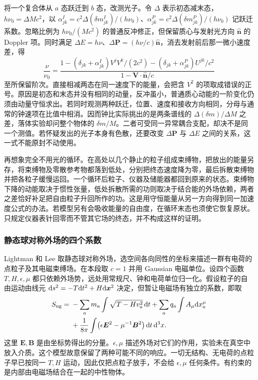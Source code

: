 将一个复合体从 $a$ 态跃迁到 $b$ 态，改测光子。令 $\Delta$ 表示初态减末态，$h\nu_0=\Delta Mc^2$，以 $\alpha^I_{jk}=c^2\Delta(\delta m^I_{jk})/(h\nu_0)$、$\alpha^P_{jk}=c^2\Delta(\delta m^P_{jk})/(h\nu_0)$ 记跃迁系数。忽略比例为 $h\nu_0/(Mc^2)$ 的普通反冲修正，但保留质心与发射光方向 $\hat{\bm n}$ 的 Doppler 项。同时满足 $\Delta E=h\nu$、$\Delta\bm P=(h\nu/c)\hat{\bm n}$，消去发射前后那一微小速度差，得
\[
 \frac{\nu}{\nu_0}=
 \frac{1-(\delta_{jk}+\alpha^I_{jk})V^jV^k/(2c^2)
         -(\delta_{jk}+\alpha^P_{jk})U^{jk}/c^2}
      {1-\bm V\cdot\hat{\bm n}/c}
\]
至所保留阶次。直接相减两态在同一速度下的能量，会把含 $V^2$ 的项取成错误的正号。原因是初态和末态并没有相同的动量，反冲虽小，普通质心动能的一阶变化仍须由动量守恒求出。若同时观测两种跃迁，位置、速度和接收方向相同，分母与通常的钟速项在比值中相消。因而钟比实际挑出的是两条谱线的 $\Delta(\delta m)/\Delta M$ 之差，落体实验却问整个物体的 $\delta m/M$。二者可受同一异常耦合支配，却决不是同一个测值。若怀疑发出的光子本身有色散，还要改变 $\Delta\bm P$ 与 $\Delta E$ 之间的关系，这一式不能原封不动使用。

再想象完全不用光的循环。在高处以几个静止的粒子组成束缚物，把放出的能量另存，将束缚物及零散参考物都落到低处，分别把终态速度降为零，最后拆散束缚物并把各粒子缓慢运回。一个循环后粒子、仪器及储能器都回到原来的状态。束缚物下降的动能取决于惯性张量，低处拆散所需的功则取决于结合能的外场依赖，两者之差恰好补足把自由粒子升回所作的功。这是用守恒能量从另一方向得到同一加速度公式的办法。若模型另有会吸收能量的自由度，在循环末态也须使它恢复原状。只规定仪器表针回零而不管其它场的终态，并不构成这样的证明。

\subsubsection{静态球对称外场的四个系数}

Lightman 和 Lee 取静态球对称外场，选空间各向同性的坐标来描述一群有电荷的点粒子及其电磁束缚场。在本段取 $c=1$ 并用 Gaussian 电磁单位。设四个函数 $T,H,\epsilon,\mu$ 都只依赖外场势，远处用常规尺、钟和电荷单位归一化。假设粒子的自由运动由线元 $\dd s^2=-T\dd t^2+H\dd\bm x^2$ 决定，但暂让电磁场有独立的系数，即取
\[
\begin{split}
 S_{\rm ng}={}&-\sum_a m_a\int\sqrt{T-Hv_a^2}\,\dd t
             +\sum_a q_a\int A_\mu\dd x_a^\mu\\
 &+\frac{1}{8\pi}\int\bigl(\epsilon\bm E^2-\mu^{-1}\bm B^2\bigr)\,\dd t\,\dd^3x .
\end{split}
\]
这里 $\bm E,\bm B$ 是由坐标势得出的分量。$\epsilon,\mu$ 描述外场对它们的作用，实验未在真空中放入介质。这个模型故意保留了两种可能不同的响应。一切无结构、无电荷的点粒子早已按同一 $T,H$ 运动，因此仅把点粒子放手，不会给 $\epsilon,\mu$ 任何条件。有约束的是内部由电磁场结合在一起的中性物体。


